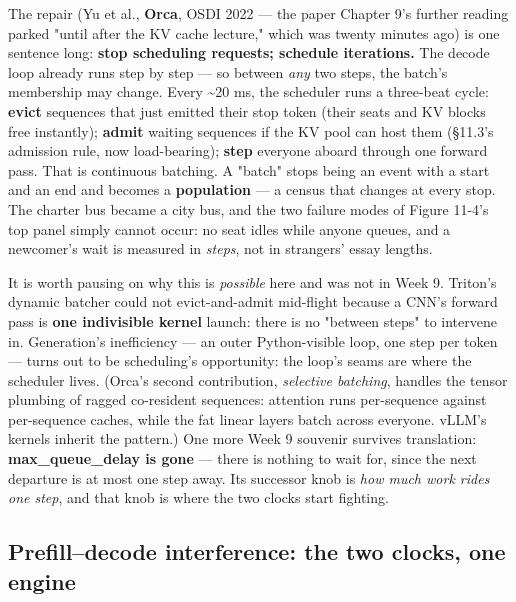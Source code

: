 The repair (Yu et al., \textbf{Orca}, OSDI 2022 — the paper Chapter 9's further reading parked "until after the KV cache lecture," which was twenty minutes ago) is one sentence long: \textbf{stop scheduling requests; schedule iterations.} The decode loop already runs step by step — so between \textit{any} two steps, the batch's membership may change. Every \textasciitilde{}20 ms, the scheduler runs a three-beat cycle: \textbf{evict} sequences that just emitted their stop token (their seats and KV blocks free instantly); \textbf{admit} waiting sequences if the KV pool can host them (§11.3's admission rule, now load-bearing); \textbf{step} everyone aboard through one forward pass. That is continuous batching. A "batch" stops being an event with a start and an end and becomes a \textbf{population} — a census that changes at every stop. The charter bus became a city bus, and the two failure modes of Figure 11-4's top panel simply cannot occur: no seat idles while anyone queues, and a newcomer's wait is measured in \textit{steps}, not in strangers' essay lengths.

It is worth pausing on why this is \textit{possible} here and was not in Week 9. Triton's dynamic batcher could not evict-and-admit mid-flight because a CNN's forward pass is \textbf{one indivisible kernel} launch: there is no "between steps" to intervene in. Generation's inefficiency — an outer Python-visible loop, one step per token — turns out to be scheduling's opportunity: the loop's seams are where the scheduler lives. (Orca's second contribution, \textit{selective batching}, handles the tensor plumbing of ragged co-resident sequences: attention runs per-sequence against per-sequence caches, while the fat linear layers batch across everyone. vLLM's kernels inherit the pattern.) One more Week 9 souvenir survives translation: \textbf{max\_queue\_delay is gone} — there is nothing to wait for, since the next departure is at most one step away. Its successor knob is \textit{how much work rides one step}, and that knob is where the two clocks start fighting.

\subsection*{Prefill–decode interference: the two clocks, one engine}

